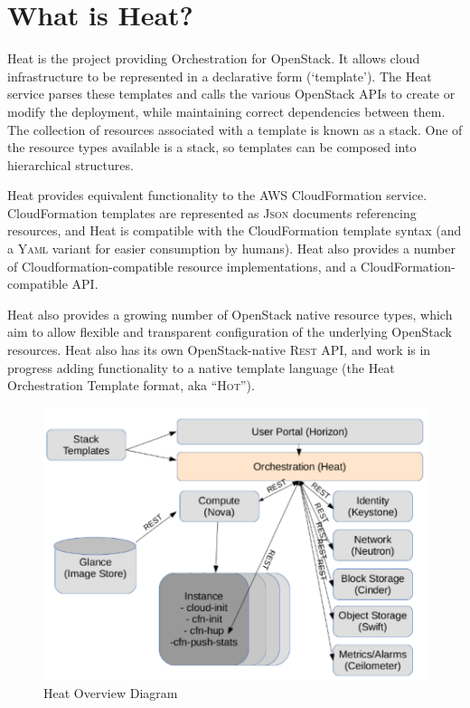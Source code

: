 \section{What is Heat?}

Heat is the project providing Orchestration for OpenStack. It allows cloud infrastructure to be represented in a declarative form (`template'). The Heat service parses these templates and calls the various OpenStack APIs to create or modify the deployment, while maintaining correct dependencies between them. The collection of resources associated with a template is known as a stack. One of the resource types available is a stack, so templates can be composed into hierarchical structures.

Heat provides equivalent functionality to the AWS CloudFormation service. CloudFormation templates are represented as \textsc{Json} documents referencing resources, and Heat is compatible with the CloudFormation template syntax (and a \textsc{Yaml} variant for easier consumption by humans).  Heat also provides a number of Cloudformation-compatible resource implementations, and a CloudFormation-compatible API.

Heat also provides a growing number of OpenStack native resource types, which aim to allow flexible and transparent configuration of the underlying OpenStack resources. Heat also has its own OpenStack-native \textsc{Rest} API, and work is in progress adding functionality to a native template language (the Heat Orchestration Template format, aka ``\textsc{Hot}'').

\begin{figure}[h!]
\caption{Heat Overview Diagram}\label{HeatOverviewFigure}
\centering
\includegraphics[scale=0.5]{images/heat-overview-diagram-small.pdf}
\end{figure}
